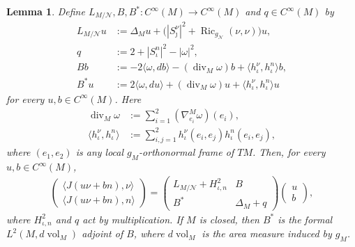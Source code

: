 \documentclass[a4paper,11pt,oneside,reqno]{amsart}
\numberwithin{equation}{section}
\newtheorem{lemma}[theorem]{Lemma}
\theoremstyle{definition}
\renewcommand{\b}{\mathbb{B}}
\begin{document}
\begin{lemma}
    \label{lem:s4-normal-linearization}
    Define $L_{M/\mathcal{N}},B,B^*:C^\infty(M)\to
    C^\infty(M)$ and $q\in C^\infty(M)$ by
    \begin{align}
        L_{M/\mathcal{N}}u
        &:=\Delta_Mu+
        \bigl(|S_\jmath^\nu|^2+
        \operatorname{Ric}_{g_{\mathcal{N}}}(\nu,\nu)
        \bigr)u,
        \label{eq:s4-scalar-Jacobi}\\
        q&:=2+|S_\iota^n|^2-|\omega|^2,\nonumber\\
        Bb&:=-2\langle\omega,db\rangle
        -(\operatorname{div}_M\omega)b
        +\langle h_\iota^\nu,h_\iota^n\rangle b,\nonumber\\
        B^*u&:=2\langle\omega,du\rangle
        +(\operatorname{div}_M\omega)u
        +\langle h_\iota^\nu,h_\iota^n\rangle u\nonumber
    \end{align}
    for every $u,b\in C^\infty(M)$. Here
    \begin{align*}
        \operatorname{div}_M\omega
        &:=\sum_{i=1}^2(\nabla^M_{e_i}\omega)(e_i),\\
        \langle h_\iota^\nu,h_\iota^n\rangle
        &:=\sum_{i,j=1}^2h_\iota^\nu(e_i,e_j)h_\iota^n(e_i,e_j),
    \end{align*}
    where $(e_1,e_2)$ is any local $g_M$-orthonormal
    frame of $TM$.
    Then, for every $u,b\in C^\infty(M)$,
    \begin{align}
        \label{eq:s4-J-matrix}
        \begin{pmatrix}
            \langle J(u\nu+bn),\nu\rangle\\
            \langle J(u\nu+bn),n\rangle
        \end{pmatrix}
        =
        \begin{pmatrix}
            L_{M/\mathcal{N}}+H_{\iota,n}^2&B\\
            B^*&\Delta_M+q
        \end{pmatrix}
        \begin{pmatrix}u\\b\end{pmatrix},
    \end{align}
    where $H_{\iota,n}^2$ and $q$ act by multiplication.
    If $M$ is closed, then $B^*$ is the formal
    $L^2(M,d\operatorname{vol}_M)$ adjoint of $B$, where $d\operatorname{vol}_M$
    is the area measure induced by $g_M$.
\end{lemma}
\end{document}
